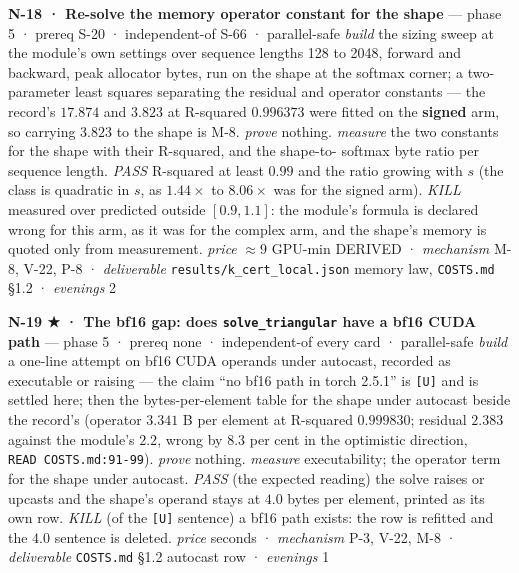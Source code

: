 \documentclass[11pt,a4paper]{article}
\newcounter{none}                 %
\theoremstyle{plain}
\theoremstyle{definition}
\theoremstyle{remark}
\begin{document}
\textbf{N-18 · Re-solve the memory operator constant for the shape} ---
phase 5 · prereq S-20 · independent-of S-66 · parallel-safe \emph{build}
the sizing sweep at the module's own settings over sequence lengths 128
to 2048, forward and backward, peak allocator bytes, run on the shape at
the softmax corner; a two-parameter least squares separating the
residual and operator constants --- the record's \(17.874\) and
\(3.823\) at R-squared \(0.996373\) were fitted on the \textbf{signed}
arm, so carrying \(3.823\) to the shape is M-8. \emph{prove} nothing.
\emph{measure} the two constants for the shape with their R-squared, and
the shape-to- softmax byte ratio per sequence length. \emph{PASS}
R-squared at least \(0.99\) and the ratio growing with \(s\) (the class
is quadratic in \(s\), as \(1.44\times\) to \(8.06\times\) was for the
signed arm). \emph{KILL} measured over predicted outside \([0.9,1.1]\):
the module's formula is declared wrong for this arm, as it was for the
complex arm, and the shape's memory is quoted only from measurement.
\emph{price} \(\approx9\) GPU-min DERIVED · \emph{mechanism} M-8, V-22,
P-8 · \emph{deliverable} \texttt{results/k\_cert\_local.json} memory
law, \texttt{COSTS.md} §1.2 · \emph{evenings} 2

\textbf{N-19 ★ · The bf16 gap: does \texttt{solve\_triangular} have a
bf16 CUDA path} --- phase 5 · prereq none · independent-of every card ·
parallel-safe \emph{build} a one-line attempt on bf16 CUDA operands
under autocast, recorded as executable or raising --- the claim ``no
bf16 path in torch 2.5.1'' is \texttt{{[}U{]}} and is settled here; then
the bytes-per-element table for the shape under autocast beside the
record's (operator \(3.341\) B per element at R-squared \(0.999830\);
residual \(2.383\) against the module's \(2.2\), wrong by \(8.3\) per
cent in the optimistic direction, \texttt{READ\ COSTS.md:91-99}).
\emph{prove} nothing. \emph{measure} executability; the operator term
for the shape under autocast. \emph{PASS} (the expected reading) the
solve raises or upcasts and the shape's operand stays at \(4.0\) bytes
per element, printed as its own row. \emph{KILL} (of the
\texttt{{[}U{]}} sentence) a bf16 path exists: the row is refitted and
the \(4.0\) sentence is deleted. \emph{price} seconds · \emph{mechanism}
P-3, V-22, M-8 · \emph{deliverable} \texttt{COSTS.md} §1.2 autocast row
· \emph{evenings} 1
\end{document}
